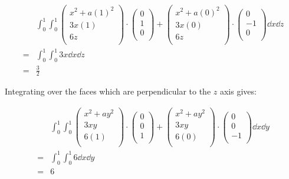 \documentclass[10pt,\jkfside,a4paper]{article}
\begin{document}
\begin{enumerate}
\begin{enumerate}
\[
\begin{split}
 & \int^1_0\int^1_0 \begin{pmatrix} x^2 + a(1)^2 \\ 3x(1) \\ 6z \\ \end{pmatrix} \cdot \begin{pmatrix} 0 \\ 1 \\ 0 \\ \end{pmatrix} +  \begin{pmatrix} x^2 + a(0)^2 \\ 3x(0) \\ 6z \\ \end{pmatrix} \cdot \begin{pmatrix} 0 \\ -1 \\ 0 \\ \end{pmatrix} \dd{x}\dd{z} \\
=& \int^1_0\int^1_0 3x \dd{x}\dd{z} \\
=& \frac{3}{2}
\end{split}
\]

Integrating over the faces which are perpendicular to the $z$ axis gives:

\[
\begin{split}
 & \int^1_0\int^1_0 \begin{pmatrix} x^2 + ay^2 \\ 3xy \\ 6(1) \\ \end{pmatrix} \cdot \begin{pmatrix} 0 \\ 0 \\ 1 \\ \end{pmatrix} + \begin{pmatrix} x^2 + ay^2 \\ 3xy \\ 6(0) \\ \end{pmatrix} \cdot \begin{pmatrix} 0 \\ 0 \\ -1 \\ \end{pmatrix} \dd{x}\dd{y} \\
=& \int^1_0\int^1_0 6 \dd{x}\dd{y} \\
=& 6 \\
\end{split}
\]


\end{enumerate}
\end{enumerate}
\end{document}
